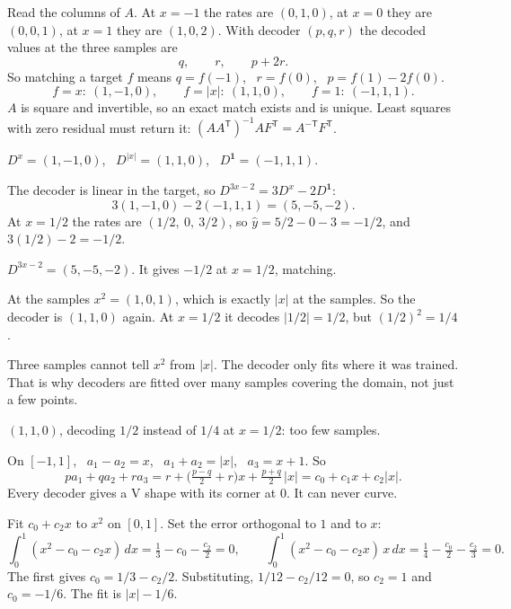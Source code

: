 \documentclass[11pt,letterpaper]{article}
\newcommand{\T}{\mathsf T}
\newcommand{\ans}[1]{\par\vspace{4pt}{\bfseries #1}\quad}
\begin{document}
\ans{(b)}
Read the columns of $A$. At $x = -1$ the rates are $(0, 1, 0)$, at $x = 0$ they are $(0, 0, 1)$, at $x = 1$ they are $(1, 0, 2)$. With decoder $(p, q, r)$ the decoded values at the three samples are
\[
q, \qquad r, \qquad p + 2r .
\]
So matching a target $f$ means $q = f(-1)$, \ $r = f(0)$, \ $p = f(1) - 2f(0)$.
\[
f = x:\ (1, -1, 0), \qquad f = |x|:\ (1, 1, 0), \qquad f = 1:\ (-1, 1, 1).
\]
$A$ is square and invertible, so an exact match exists and is unique. Least squares with zero residual must return it: $(AA^\T)^{-1} A F^\T = A^{-\T} F^\T$.
\begin{result}
$D^{x} = (1, -1, 0)$, \ $D^{|x|} = (1, 1, 0)$, \ $D^{\mathbf 1} = (-1, 1, 1)$.
\end{result}

\ans{(c)}
The decoder is linear in the target, so $D^{3x - 2} = 3D^x - 2D^{\mathbf 1}$:
\[
3(1, -1, 0) - 2(-1, 1, 1) = (5, -5, -2).
\]
At $x = 1/2$ the rates are $(1/2,\ 0,\ 3/2)$, so $\hat y = 5/2 - 0 - 3 = -1/2$, and $3(1/2) - 2 = -1/2$.
\begin{result}
$D^{3x-2} = (5, -5, -2)$. It gives $-1/2$ at $x = 1/2$, matching.
\end{result}

\ans{(d)}
At the samples $x^2 = (1, 0, 1)$, which is exactly $|x|$ at the samples. So the decoder is $(1, 1, 0)$ again. At $x = 1/2$ it decodes $|1/2| = 1/2$, but $(1/2)^2 = 1/4$.

Three samples cannot tell $x^2$ from $|x|$. The decoder only fits where it was trained. That is why decoders are fitted over many samples covering the domain, not just a few points.
\begin{result}
$(1, 1, 0)$, decoding $1/2$ instead of $1/4$ at $x = 1/2$: too few samples.
\end{result}

\ans{(e)}
On $[-1, 1]$, \ $a_1 - a_2 = x$, \ $a_1 + a_2 = |x|$, \ $a_3 = x + 1$. So
\[
p a_1 + q a_2 + r a_3 = r + \Big(\tfrac{p - q}{2} + r\Big) x + \tfrac{p + q}{2}\,|x| = c_0 + c_1 x + c_2|x| .
\]
Every decoder gives a V shape with its corner at $0$. It can never curve.

Fit $c_0 + c_2 x$ to $x^2$ on $[0, 1]$. Set the error orthogonal to $1$ and to $x$:
\[
\int_0^1 (x^2 - c_0 - c_2 x)\,dx = \tfrac13 - c_0 - \tfrac{c_2}{2} = 0, \qquad
\int_0^1 (x^2 - c_0 - c_2 x)\,x\,dx = \tfrac14 - \tfrac{c_0}{2} - \tfrac{c_2}{3} = 0 .
\]
The first gives $c_0 = 1/3 - c_2/2$. Substituting, $1/12 - c_2/12 = 0$, so $c_2 = 1$ and $c_0 = -1/6$. The fit is $|x| - 1/6$.
\end{document}
